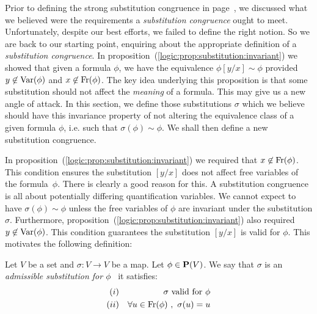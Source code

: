 Prior to defining the strong substitution congruence in
page~\pageref{logic:def:strong:sub:congruence}, we discussed what we
believed were the requirements a {\em substitution congruence} ought
to meet. Unfortunately, despite our best efforts, we failed to
define the right notion. So we are back to our starting point,
enquiring about the appropriate definition of a {\em substitution
congruence}. In
proposition~(\ref{logic:prop:substitution:invariant}) we showed that
given a formula $\phi$, we have the equivalence $\phi[y/x]\sim\phi$
provided $y\not\in\mbox{\rm Var}(\phi)$ and $x\not\in\mbox{\rm Fr}(\phi)$. The key
idea underlying this proposition is that some substitution should
not affect the {\em meaning} of a formula. This may give us a new
angle of attack. In this section, we define those substitutions
$\sigma$ which we believe should have this invariance property of
not altering the equivalence class of a given formula $\phi$, i.e.
such that $\sigma(\phi)\sim\phi$. We shall then define a new
substitution congruence.

In proposition~(\ref{logic:prop:substitution:invariant}) we required
that $x\not\in\mbox{\rm Fr}(\phi)$. This condition ensures the substitution
$[y/x]$ does not affect free variables of the formula~$\phi$. There
is clearly a good reason for this. A substitution congruence is all
about potentially differing quantification variables. We cannot
expect to have $\sigma(\phi)\sim\phi$ unless the free variables of
$\phi$ are invariant under the substitution $\sigma$. Furthermore,
proposition~(\ref{logic:prop:substitution:invariant}) also required
$y\not\in\mbox{\rm Var}(\phi)$. This condition guarantees the substitution
$[y/x]$ is valid for $\phi$. This motivates the following
definition:
\begin{defin}\label{logic:def:admissible:substitution}
Let $V$ be a set and $\sigma:V\to V$ be a map. Let $\phi\in\mbox{${\bf P}(V)$}$. We
say that $\sigma$ is an {\em admissible substitution for $\phi$}
\ifand\ it satisfies:
    \begin{eqnarray*}
    (i)&&\mbox{$\sigma$ valid for $\phi$}\\
    (ii)&&\forall u\in\mbox{\rm Fr}(\phi)\ ,\ \sigma(u)=u
    \end{eqnarray*}
\end{defin}

